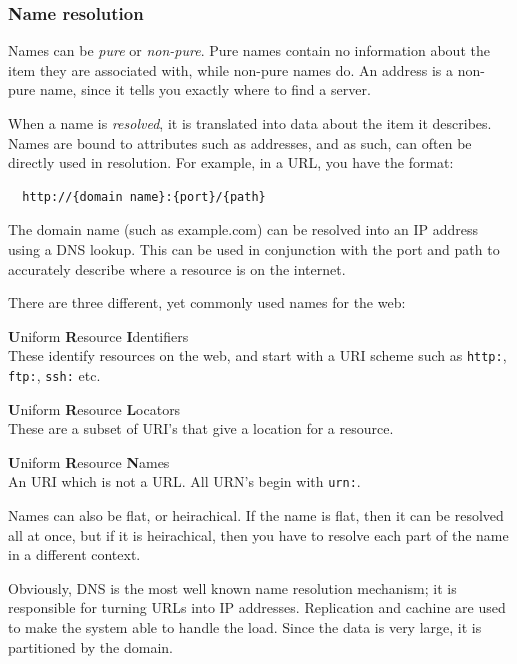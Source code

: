 \subsubsection{Name resolution}

Names can be \textit{pure} or \textit{non-pure}. Pure names contain no
information about the item they are associated with, while non-pure names do. An
address is a non-pure name, since it tells you exactly where to find a server.

When a name is \textit{resolved}, it is translated into data about the item it
describes. Names are bound to attributes such as addresses, and as such, can
often be directly used in resolution. For example, in a URL, you have the
format:

\begin{verbatim}
  http://{domain name}:{port}/{path}
\end{verbatim}

The domain name (such as example.com) can be resolved into an IP address using a
DNS lookup. This can be used in conjunction with the port and path to accurately
describe where a resource is on the internet.

There are three different, yet commonly used names for the web:

\begin{description}
  \item \textbf{U}niform \textbf{R}esource \textbf{I}dentifiers\\
    These identify resources on the web, and start with a URI scheme such as
    \texttt{http:}, \texttt{ftp:}, \texttt{ssh:} etc.
  \item \textbf{U}niform \textbf{R}esource \textbf{L}ocators\\
    These are a subset of URI's that give a location for a resource.
  \item \textbf{U}niform \textbf{R}esource \textbf{N}ames\\
    An URI which is not a URL. All URN's begin with \texttt{urn:}.
\end{description}

Names can also be flat, or heirachical. If the name is flat, then it can be
resolved all at once, but if it is heirachical, then you have to resolve each
part of the name in a different context.

Obviously, DNS is the most well known name resolution mechanism; it is
responsible for turning URLs into IP addresses. Replication and cachine are used
to make the system able to handle the load. Since the data is very large, it is
partitioned by the domain.

